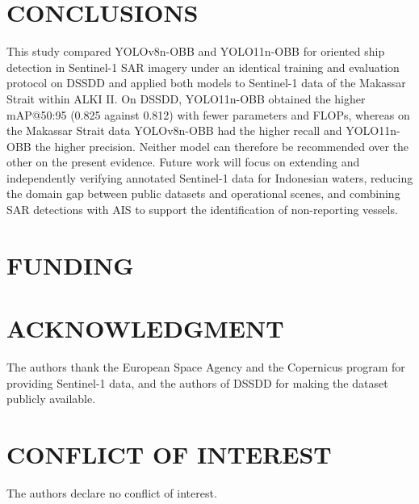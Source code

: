 \documentclass[conference]{IEEEtran}
\begin{document}
\section{CONCLUSIONS}
This study compared YOLOv8n-OBB and YOLO11n-OBB for oriented ship detection in Sentinel-1 SAR imagery under an identical training and evaluation protocol on DSSDD and applied both models to Sentinel-1 data of the Makassar Strait within ALKI II. On DSSDD, YOLO11n-OBB obtained the higher mAP@50:95 (0.825 against 0.812) with fewer parameters and FLOPs, whereas on the Makassar Strait data YOLOv8n-OBB had the higher recall and YOLO11n-OBB the higher precision. Neither model can therefore be recommended over the other on the present evidence. Future work will focus on extending and independently verifying annotated Sentinel-1 data for Indonesian waters, reducing the domain gap between public datasets and operational scenes, and combining SAR detections with AIS to support the identification of non-reporting vessels.

\section*{FUNDING}


\section*{ACKNOWLEDGMENT}
The authors thank the European Space Agency and the Copernicus program for providing Sentinel-1 data, and the authors of DSSDD for making the dataset publicly available.

\section*{CONFLICT OF INTEREST}
The authors declare no conflict of interest.
\end{document}
